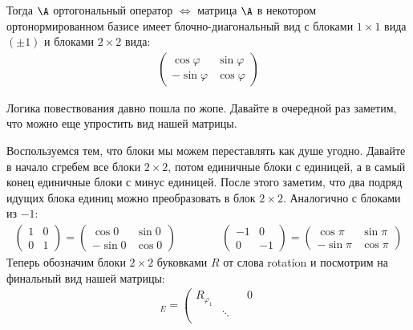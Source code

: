 \begin{enumerate}
    Тогда $\A$ ортогональный оператор $\Longleftrightarrow$ матрица $\A$ в 
    некотором ортонормированном базисе имеет блочно-диагональный вид с блоками $1 \times 1$ вида $(\pm 1)$ и
    блоками $2 \times 2$ вида:
    \begin{gather*}
        \left(\begin{array}{cc}
            \cos{\varphi} & \sin{\varphi} \\ 
            -\sin{\varphi} & \cos{\varphi}
        \end{array}\right)
    \end{gather*}

    Логика повествования давно пошла по жопе. Давайте в очередной раз заметим, что можно еще упростить вид нашей матрицы. 

    Воспользуемся тем, что блоки мы можем переставлять как душе угодно. Давайте в начало сгребем все блоки $2 \times 2$, потом единичные блоки 
    с единицей, а в самый конец единичные блоки с минус единицей. После этого 
    заметим, что два подряд идущих блока единиц можно преобразовать в блок $2 \times 2$. Аналогично с блоками из $-1$: 
    \begin{gather*}
        \left(\begin{array}{cc}
            1 & 0 \\ 
            0 & 1
        \end{array}\right) = \left(\begin{array}{cc}
            \cos{0} & \sin{0} \\ 
            -\sin{0} & \cos{0}
        \end{array}\right) \qquad \qquad
        \left(\begin{array}{cc}
            -1 & 0 \\
            0 & -1
        \end{array}\right) = \left(\begin{array}{cc}
            \cos{\pi} & \sin{\pi} \\
            -\sin{\pi} & \cos{\pi}
        \end{array}\right)
    \end{gather*}
    Теперь обозначим блоки $2 \times 2$ буковками $R$ от слова rotation и посмотрим на финальный вид нашей матрицы: 
    \begin{gather*}
        [\A]_{E} = \left(\begin{array}{cccc}
            R_{\varphi_1} &  &  & 0 \\ 
            & \ddots &  &  \\ 

\end{array}
\end{gather*}
\end{enumerate}
